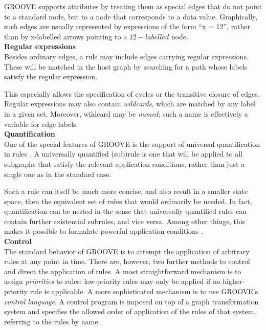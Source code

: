 GROOVE supports attributes by treating them as special edges that do not point to a standard node, but to a node that corresponds to a data value. Graphically, such edges are usually represented by expressions of the form \enquote{x = 12}, rather than by x-labelled arrows pointing to a $12-labelled$ node.\\ 
\textbf{Regular expressions}\\
Besides ordinary edges, a rule may include edges carrying regular expressions. These will be matched in the host graph by searching for a path whose labels satisfy the regular expression. 

This especially allows the speciﬁcation of cycles or the transitive closure of edges. Regular expressions may also contain \emph{wildcards}, which are matched by any label in a given set. Moreover, wildcard may be \emph{named}; such a name is effectively a variable for edge labels.\\ 
\textbf{Quantiﬁcation}\\ 
One of the special features of GROOVE is the support of universal quantiﬁcation in rules \cite{rensink2009repotting}. A universally quantiﬁed (sub)rule is one that will be applied to all subgraphs that satisfy the relevant application conditions, rather than just a single one as in the standard case. 

Such a rule can itself be much more concise, and also result in a smaller state space, then the equivalent set of rules that would ordinarily be needed. In fact, quantiﬁcation can be nested in the sense that universally quantiﬁed rules can contain further existential subrules, and vice versa. Among other things, this makes it possible to formulate powerful application conditions \cite{rensink2004representing}.\\ 
\textbf{Control}\\ 
The standard behavior of GROOVE is to attempt the application of arbitrary rules at any point in time. There are, however, two further methods to control and direct the application of rules. A most straightforward mechanism is to assign \emph{priorities} to rules: low-priority rules may only be applied if no higher-priority rule is applicable. A more sophisticated mechanism is to use GROOVE’s \emph{control language}.
A control program is imposed on top of a graph transformation system and speciﬁes the allowed order of application of the rules of that system, referring to the rules by name. 

